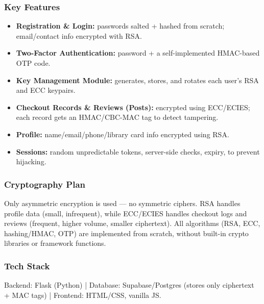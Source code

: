 \documentclass{article}
\begin{document}
\subsubsection*{Key Features}
\begin{itemize}
    \item \textbf{Registration \& Login:} passwords salted + hashed from scratch; email/contact info encrypted with RSA.
    \item \textbf{Two-Factor Authentication:} password + a self-implemented HMAC-based OTP code.
    \item \textbf{Key Management Module:} generates, stores, and rotates each user's RSA and ECC keypairs.
    \item \textbf{Checkout Records \& Reviews (Posts):} encrypted using ECC/ECIES; each record gets an HMAC/CBC-MAC tag to detect tampering.
    \item \textbf{Profile:} name/email/phone/library card info encrypted using RSA.
    \item \textbf{Sessions:} random unpredictable tokens, server-side checks, expiry, to prevent hijacking.
\end{itemize}

\subsubsection*{Cryptography Plan}
Only asymmetric encryption is used --- no symmetric ciphers. RSA handles profile data (small, infrequent), while ECC/ECIES handles checkout logs and reviews (frequent, higher volume, smaller ciphertext). All algorithms (RSA, ECC, hashing/HMAC, OTP) are implemented from scratch, without built-in crypto libraries or framework functions.

\subsubsection*{Tech Stack}
Backend: Flask (Python) | Database: Supabase/Postgres (stores only ciphertext + MAC tags) | Frontend: HTML/CSS, vanilla JS.
\end{document}
